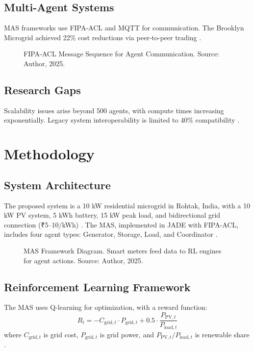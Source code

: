 \documentclass[12pt]{report}
\begin{document}
\section{Multi-Agent Systems}
MAS frameworks use FIPA-ACL and MQTT for communication. The Brooklyn Microgrid achieved 22\% cost reductions via peer-to-peer trading \cite{brooklyn2022}.

\begin{figure}[h]
  \centering
  \caption{FIPA-ACL Message Sequence for Agent Communication. Source: Author, 2025.}
  \label{fig:fipa_acl}
\end{figure}

\section{Research Gaps}
Scalability issues arise beyond 500 agents, with compute times increasing exponentially. Legacy system interoperability is limited to 40\% compatibility \cite{zhang2020}.

\clearpage
\chapter{Methodology}
\label{chap:methodology}
\section{System Architecture}
The proposed system is a 10 kW residential microgrid in Rohtak, India, with a 10 kW PV system, 5 kWh battery, 15 kW peak load, and bidirectional grid connection (₹5--10/kWh) \cite{mnre2023}. The MAS, implemented in JADE with FIPA-ACL, includes four agent types: Generator, Storage, Load, and Coordinator \cite{fipa2020}.

\begin{figure}[h]
  \centering
  \caption{MAS Framework Diagram. Smart meters feed data to RL engines for agent actions. Source: Author, 2025.}
  \label{fig:mas_architecture}
\end{figure}

\section{Reinforcement Learning Framework}
The MAS uses Q-learning for optimization, with a reward function:
\begin{equation}
R_t = -C_{\text{grid},t} \cdot P_{\text{grid},t} + 0.5 \cdot \frac{P_{\text{PV},t}}{P_{\text{load},t}}
\label{eq:reward}
\end{equation}
where $C_{\text{grid},t}$ is grid cost, $P_{\text{grid},t}$ is grid power, and $P_{\text{PV},t}/P_{\text{load},t}$ is renewable share \cite{zhou2021}.
\end{document}
